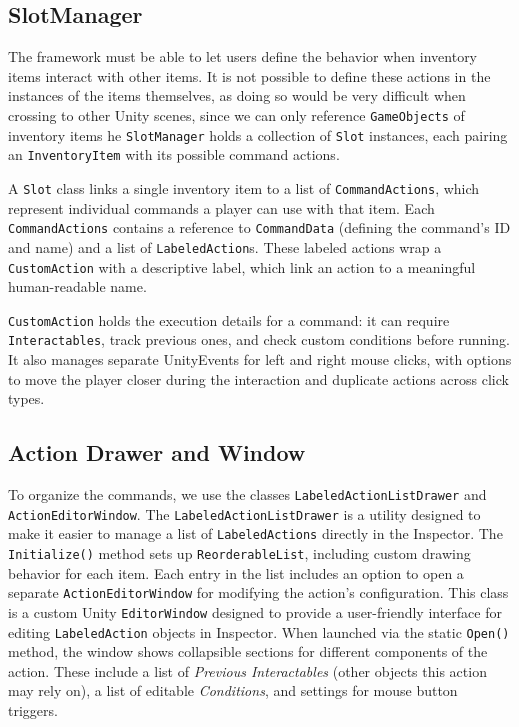 \subsection{SlotManager}
The framework must be able to let users define the behavior when inventory items interact with other items. It is not possible to define these actions in the instances of the items themselves, as doing so would be very difficult when crossing to other Unity scenes, since we can only reference \verb|GameObjects| of inventory items he \verb|SlotManager| holds a collection of \verb|Slot| instances, each pairing an \verb|InventoryItem| with its possible command actions.

A \verb|Slot| class links a single inventory item to a list of \verb|CommandActions|, which represent individual commands a player can use with that item. Each \verb|CommandActions| contains a reference to \verb|CommandData| (defining the command’s ID and name) and a list of \verb|LabeledAction|s. These labeled actions wrap a \verb|CustomAction| with a descriptive label, which link an action to a meaningful human-readable name.

\verb|CustomAction| holds the execution details for a command: it can require \verb|Interactables|, track previous ones, and check custom conditions before running. It also manages separate UnityEvents for left and right mouse clicks, with options to move the player closer during the interaction and duplicate actions across click types.


\subsection{Action Drawer and Window}
To organize the commands, we use the classes \verb|LabeledActionListDrawer| and \verb|ActionEditorWindow|. The \verb|LabeledActionListDrawer| is a utility designed to make it easier to manage a list of \verb|LabeledActions| directly in the Inspector. The \verb|Initialize()| method sets up \verb|ReorderableList|, including custom drawing behavior for each item. Each entry in the list includes an option to open a separate \verb|ActionEditorWindow| for modifying the action’s configuration. This class is a custom Unity \verb|EditorWindow| designed to provide a user-friendly interface for editing \verb|LabeledAction| objects in Inspector. When launched via the static \verb|Open()| method, the window shows collapsible sections for different components of the action. These include a list of \textit{Previous Interactables} (other objects this action may rely on), a list of editable \textit{Conditions}, and settings for mouse button triggers.

